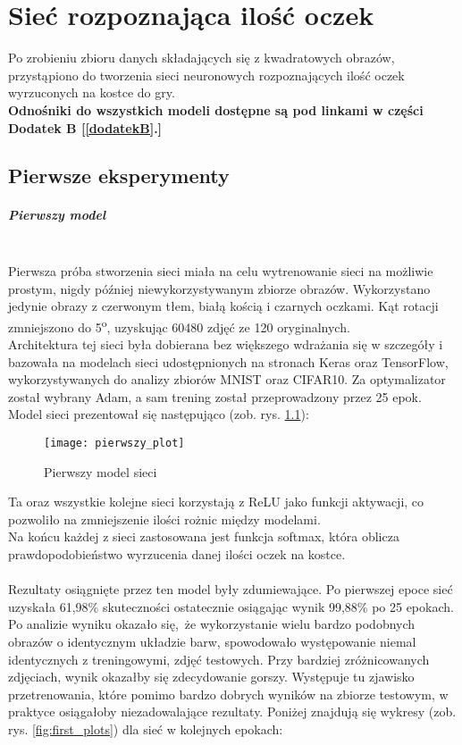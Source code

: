 
\chapter{Sieć rozpoznająca ilość oczek}
Po zrobieniu zbioru danych składających się z kwadratowych obrazów, przystąpiono
do tworzenia sieci neuronowych rozpoznających ilość oczek wyrzuconych na kostce do gry.\\
\textbf{Odnośniki do wszystkich modeli dostępne są pod linkami w części Dodatek B [\ref{dodatekB}.] }

\section{Pierwsze eksperymenty}
\paragraph{Pierwszy model} \mbox{}\\
Pierwsza próba stworzenia sieci miała
na celu wytrenowanie sieci na możliwie prostym, nigdy później niewykorzystywanym zbiorze obrazów.
Wykorzystano jedynie obrazy z czerwonym tłem, białą kością i czarnych oczkami.
Kąt rotacji zmniejszono do 5\textsuperscript{o}, uzyskując 60480 zdjęć ze 120 oryginalnych.\\
Architektura tej sieci była dobierana bez większego wdrażania się w szczegóły i
bazowała na modelach sieci udostępnionych na stronach Keras oraz TensorFlow,
wykorzystywanych do analizy zbiorów MNIST oraz CIFAR10. Za optymalizator został wybrany
Adam, a sam trening został przeprowadzony przez 25 epok.
Model sieci prezentował się następująco (zob. rys. \ref{fig:first_model}): \newpage
\begin{figure}[h!]
\centering
\texttt{[image: pierwszy\_plot]}
\caption{Pierwszy model sieci}
\label{fig:first_model}
\end{figure}
Ta oraz wszystkie kolejne sieci korzystają z ReLU jako funkcji aktywacji,
co pozwoliło na zmniejszenie ilości rożnic między modelami.\\
Na końcu każdej z sieci zastosowana jest funkcja softmax, która oblicza prawdopodobieństwo
wyrzucenia danej ilości oczek na kostce.\\\\
Rezultaty osiągnięte przez ten model były zdumiewające. Po pierwszej epoce
sieć uzyskała 61,98\% skuteczności ostatecznie osiągając wynik 99,88\% po 25 epokach.\\
Po analizie wyniku okazało się, że wykorzystanie wielu bardzo podobnych obrazów o identycznym
układzie barw, spowodowało występowanie niemal identycznych z treningowymi, zdjęć testowych.
Przy bardziej zróżnicowanych zdjęciach, wynik okazałby się zdecydowanie gorszy.
Występuje tu zjawisko przetrenowania, które pomimo bardzo dobrych wyników na zbiorze testowym,
w praktyce osiągałoby niezadowalające rezultaty. Poniżej znajdują się wykresy (zob. rys. \ref{fig:first_plots})
dla sieć w kolejnych epokach:

